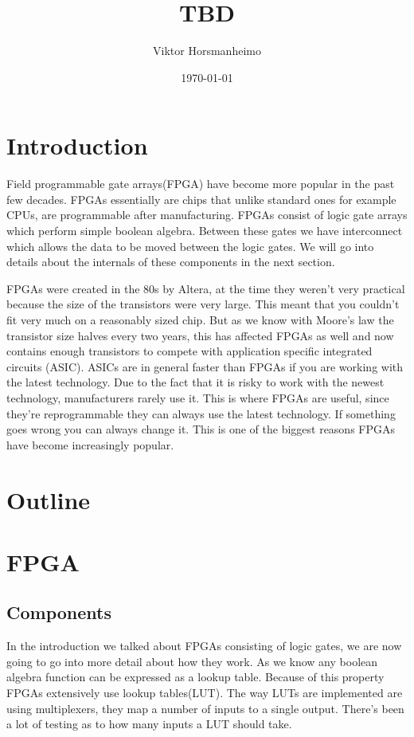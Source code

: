 \documentclass{paper}
\title{TBD}
\author{Viktor Horsmanheimo}
\date{\today}
\begin{document}
\maketitle
\tableofcontents
\newpage

\section{Introduction}
Field programmable gate arrays(FPGA) have become more popular in the past few
decades. FPGAs essentially are chips that unlike standard ones for example
CPUs, are programmable after manufacturing. FPGAs consist of logic gate arrays
which perform simple boolean algebra. Between these gates we have interconnect
which allows the data to be moved between the logic gates. We will go into
details about the internals of these components in the next section.

FPGAs were created in the 80s by Altera, at the time they weren't very
practical because the size of the transistors were very large. This meant that
you couldn't fit very much on a reasonably sized chip. But as we know with
Moore's law the transistor size halves every two years, this has affected FPGAs
as well and now contains enough transistors to compete with application
specific integrated circuits (ASIC). ASICs are in general faster than FPGAs if
you are working with the latest technology. Due to the fact that it is risky to
work with the newest technology, manufacturers rarely use it. This is where
FPGAs are useful, since they're reprogrammable they can always use the latest
technology. If something goes wrong you can always change it. This is one of
the biggest reasons FPGAs have become increasingly popular.

\section{Outline}

\section{FPGA}
\subsection{Components}
In the introduction we talked about FPGAs consisting of
logic gates, we are now going to go into more detail about how they work. As we
know any boolean algebra function can be expressed as a lookup
table\cite{m_d_mano_digital_2012}. Because of this property FPGAs extensively
use lookup tables(LUT). The way LUTs are implemented are using multiplexers,
they map a number of inputs to a single output. There's been a lot of testing
as to how many inputs a LUT should take.

\printbibliography
\end{document}
